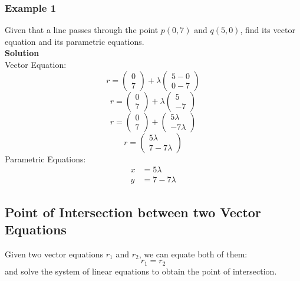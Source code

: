 \documentclass[hidelinks, a4paper, 12pt]{article}
\newcommand{\bd}{\textbf}
\newcommand{\n}{\\[\baselineskip]}
\begin{document}
            \subsubsection{Example 1}
                Given that a line passes through the point $p (0, 7)$ and $q (5, 0)$,
                find its vector equation and its parametric equations.\n
                \bd{Solution}\\
                Vector Equation:
                \[r = \begin{pmatrix} 0 \\ 7 \end{pmatrix} + \lambda\begin{pmatrix} 5-0 \\ 0-7 \end{pmatrix}\]
                \[r = \begin{pmatrix} 0 \\ 7 \end{pmatrix} + \lambda\begin{pmatrix} 5 \\ -7 \end{pmatrix}\]
                \[r = \begin{pmatrix} 0 \\ 7 \end{pmatrix} + \begin{pmatrix} 5\lambda \\ -7\lambda \end{pmatrix}\]
                \[r = \begin{pmatrix} 5\lambda \\ 7-7\lambda \end{pmatrix}\]
                Parametric Equations:
                \[\begin{split}
                    x &= 5\lambda\\
                    y &= 7 - 7\lambda
                \end{split}\]
        \subsection{Point of Intersection between two Vector Equations}
            Given two vector equations $r_1$ and $r_2$, we can equate both of them:
            \[r_1 = r_2\]
            and solve the system of linear equations to obtain the point of intersection.
\end{document}
